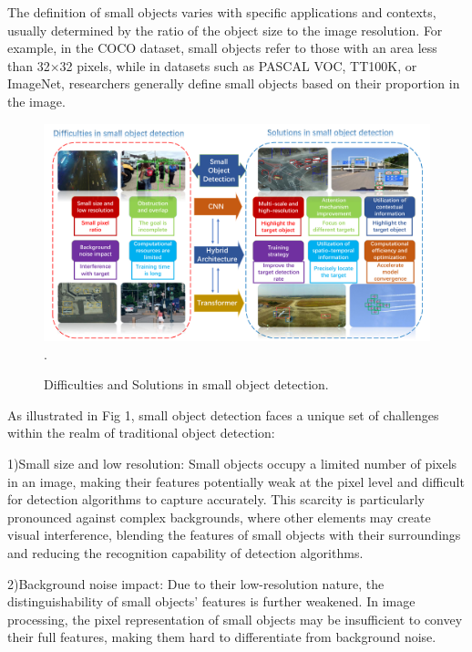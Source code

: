\documentclass[journal]{IEEEtran}
\begin{document}
The definition of small objects varies with specific applications and contexts, usually determined by the ratio of the object size to the image resolution. For example, in the COCO dataset\cite{lin2014microsoft}, small objects refer to those with an area less than 32×32 pixels, while in datasets such as PASCAL VOC\cite{everingham2010pascal}, TT100K\cite{dollar2011pedestrian}, or ImageNet\cite{deng2009imagenet}, researchers generally define small objects based on their proportion in the image.

\begin{figure}[htbp]
	\centering
	\setlength{\abovecaptionskip}{-0.6cm}
	\includegraphics[width=\textwidth]{fig 1}
	\DeclareGraphicsExtensions.
	\caption{Difficulties and Solutions in small object detection.}
	\label{fig 1}
\end{figure}

As illustrated in Fig 1, small object detection faces a unique set of challenges within the realm of traditional object detection:

  1)Small size and low resolution: Small objects occupy a limited number of pixels in an image, making their features potentially weak at the pixel level and difficult for detection algorithms to capture accurately. This scarcity is particularly pronounced against complex backgrounds, where other elements may create visual interference, blending the features of small objects with their surroundings and reducing the recognition capability of detection algorithms.
  
  2)Background noise impact: Due to their low-resolution nature, the distinguishability of small objects’ features is further weakened. In image processing, the pixel representation of small objects may be insufficient to convey their full features, making them hard to differentiate from background noise.
  
\end{document}
